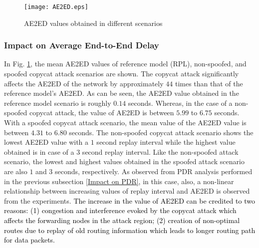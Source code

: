 \documentclass[]{svjour3}                     %
\begin{document}
\begin{figure}[!h]
	\centering
	\texttt{[image: AE2ED.eps]}
	\caption{AE2ED values obtained in different scenarios}
	\label{AE2ED}
\end{figure}

\subsubsection{Impact on Average End-to-End Delay}
In Fig. \ref{AE2ED}, the mean AE2ED values of reference model (RPL), non-spoofed, and spoofed copycat attack scenarios are shown. The copycat attack significantly affects the AE2ED of the network by approximately $ 44 $ times than that of the reference model's AE2ED. As can be seen, the AE2ED value obtained in the reference model scenario is roughly $ 0.14 $ seconds. Whereas, in the case of a non-spoofed copycat attack, the value of AE2ED is between $ 5.99 $ to $ 6.75 $ seconds. With a spoofed copycat attack scenario, the mean value of the AE2ED value is between $ 4.31 $ to $ 6.80 $ seconds. The non-spoofed copycat attack scenario shows the lowest AE2ED value with a $ 1 $ second replay interval while the highest value obtained is in case of a $ 3 $ second replay interval. Like the non-spoofed attack scenario, the lowest and highest values obtained in the spoofed attack scenario are also $ 1 $ and $ 3 $ seconds, respectively. As observed from PDR analysis performed in the previous subsection \ref{Impact on PDR}, in this case, also, a non-linear relationship between increasing values of replay interval and AE2ED is observed from the experiments. \textcolor{black}{The increase in the value of AE2ED can be credited to two reasons: (1) congestion and interference evoked by the copycat attack which affects the forwarding nodes in the attack region; (2) creation of non-optimal routes due to replay of old routing information which leads to longer routing path for data packets.} 
\end{document}
